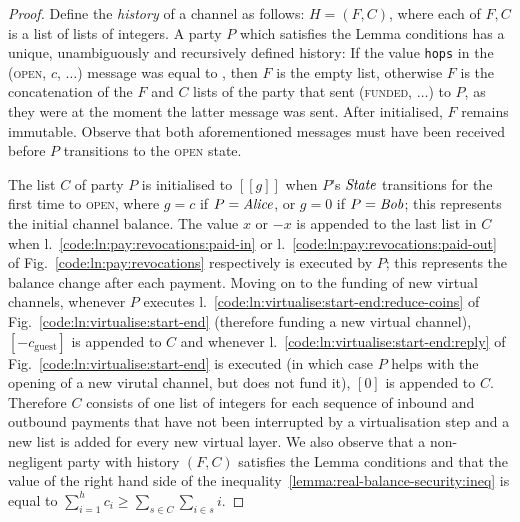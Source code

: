 \begin{proof}
  Define the \emph{history} of a channel as follows: $H = (F, C)$, where each of
  $F, C$ is a list of lists of integers. A party $P$ which satisfies the Lemma
  conditions has a unique, unambiguously and recursively defined history: If the
  value \texttt{hops} in the (\textsc{open}, $c$, $\dots$) message was equal to
  \ledger, then $F$ is the empty list, otherwise $F$ is the concatenation of the
  $F$ and $C$ lists of the party that sent (\textsc{funded}, $\dots$) to $P$, as
  they were at the moment the latter message was sent. After initialised, $F$
  remains immutable. Observe that both aforementioned messages must have been
  received before $P$ transitions to the \textsc{open} state.

  The list $C$ of party $P$ is initialised to $[[g]]$ when $P$'s $\itistate$
  transitions for the first time to \textsc{open}, where $g = c$ if $P =
  \mathit{Alice}$, or $g = 0$ if $P = \mathit{Bob}$; this represents the initial channel
  balance. The value $x$ or $-x$ is appended to the last list in $C$ when
  l.~\ref{code:ln:pay:revocations:paid-in} or
  l.~\ref{code:ln:pay:revocations:paid-out} of
  Fig.~\ref{code:ln:pay:revocations} respectively is executed by $P$; this
  represents the balance change after each payment. Moving on to the funding of
  new virtual channels, whenever $P$ executes
  l.~\ref{code:ln:virtualise:start-end:reduce-coins} of
  Fig.~\ref{code:ln:virtualise:start-end} (therefore funding a new virtual
  channel), $[-c_{\mathrm{guest}}]$ is appended to $C$ and whenever
  l.~\ref{code:ln:virtualise:start-end:reply} of
  Fig.~\ref{code:ln:virtualise:start-end} is executed (in which case $P$ helps
  with the opening of a new virutal channel, but does not fund it), $[0]$ is
  appended to $C$. Therefore $C$ consists of one list of integers for each
  sequence of inbound and outbound payments that have not been interrupted by a
  virtualisation step and a new list is added for every new virtual layer. We
  also observe that a non-negligent party with history $(F, C)$ satisfies the
  Lemma conditions and that the value of the right hand side of the
  inequality~\ref{lemma:real-balance-security:ineq} is equal to
  $\sum\limits_{i=1}^h c_i \geq \sum\limits_{s \in C} \sum\limits_{i \in s} i$.


\end{proof}
